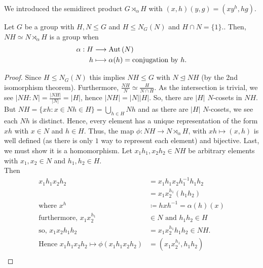 \begin{recall}
	We introduced the semidirect product \(G \rtimes_{\alpha} H\) with \(\left( x, h \right) \left( y, g \right)  = \left( xy^{h}, hg \right) \).
\end{recall}
\begin{theorem}
	Let \(G\) be a group with \(H, N \le G\) and \(H \le N_{G}\left( N \right) \) and \(H \cap N = \{1\} \).. Then, \(NH \simeq N\rtimes_{\alpha} H\) is a group when \begin{align*}
		\alpha: H &\longrightarrow \operatorname{Aut} \left( N \right)  \\
		h &\longmapsto \alpha(h) = \text{conjugation by \(h\)}
	.\end{align*}
\end{theorem}
\begin{proof}
	Since \(H \le N_{G}\left( N \right) \) this implies \(NH \le G\) with \(N \trianglelefteq NH\) (by the 2nd isomorphism theorem). Furthermore, \(\frac{NH}{N} \simeq \frac{H}{N \cap H}\). As the intersection is trivial, we see \(\left| NH : N \right|  = \frac{\left| NH \right| }{\left| N \right| } = \left| H \right| \), hence \(\left| NH \right|  = \left| N \right| \left| H \right| \). So, there are \(\left| H \right| \) \(N\)-cosets in \(NH\).\\
	But \(NH = \{xh : x \in N h \in H\}  = \bigcup_{h \in H} Nh \) and as there are \(\left| H \right| \) \(N\)-cosets, we see each \(Nh\) is distinct. Hence, every element has a unique representation of the form \(xh\) with \(x \in N\) and \(h \in H\). Thus, the map \(\phi : NH \to N \rtimes_{\alpha} H\), with \(xh \mapsto \left( x, h \right) \) is well defined (as there is only \(1\) way to represent each element) and bijective. Last, we must show it is a homomorphism. Let \(x_1h_1, x_2h_2 \in NH\)  be arbitrary elements with \(x_1, x_2 \in N\) and \(h_1, h_2 \in H\).\\
	Then
	\begin{align*}
		x_1h_1x_2h_2 &= x_1h_1x_2h_1^{-1}h_1h_2 \\
			     &= x_1 x_2^{h_1} \left( h_1h_2 \right)  \\
		\text{where } x^{h} &\coloneqq h x h^{-1} = \alpha \left( h \right) \left( x \right)  \\
		\text{furthermore, } x_1x_2^{h_1} &\in N \text{ and } h_1h_2 \in H\\
		\text{so, } x_1x_2h_1h_2 &= x_1x_2^{h_1}h_1h_2 \in NH.\\
		\text{Hence } x_1h_1x_2h_2 \mapsto \phi\left( x_1h_1x_2h_2 \right) &=  \left( x_1x_2^{h_1}, h_1h_2 \right) \\

\end{align*}
\end{proof}
